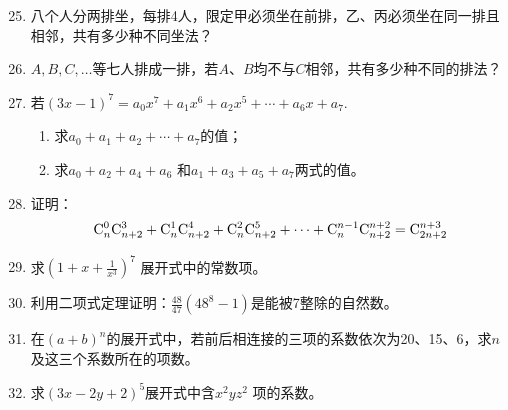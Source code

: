 \begin{enumerate}
  \setcounter{enumi}{24}  
  \item 八个人分两排坐，每排4人，限定甲必须坐在前排，乙、丙必须坐在同一排且相邻，共有多少种不同坐法？
  \item $A,B,C,\ldots$等七人排成一排，若$A$、$B$均不与$C$相邻，共有多少种不同的排法？
\item 若$(3x-1)^{7}=a_{0}x^{7}+a_{1}x^{6}+a_{2}x^{5}+\cdots+a_{6}x+a_{7}$.
\begin{enumerate}[(1)]
    \item 求$ a_{0}+a_{1}+a_{2}+\cdots+a_{7} $的值；
    \item 求$ a_{0}+a_{2}+a_{4}+a_{6}$ 和$ a_{1}+a_{3}+a_{5}+a_{7} $两式的值。
\end{enumerate}

\item 证明：
\[
\comb{n}{0}\comb{n+2}{3}+\comb{n}{1}\comb{n+2}{4}+\comb{n}{2}\comb{n+2}{5}+\cdots+\comb{n}{n-1}\comb{n+2}{n+2} =\comb{2n+2}{n+3}\]

\item 求$\left(1+x+\frac{1}{x^{3}}\right)^{7}$ 展开式中的常数项。

\item 利用二项式定理证明：$\frac{48}{47}\left(48^{8}-1\right)$是能被7整除的自然数。
\item 在$ (a+b)^{n} $的展开式中，若前后相连接的三项的系数依次为20、15、6，求$n$及这三个系数所在的项数。

\item 求$ (3x-2y+2)^{5} $展开式中含$x^{2}yz^{2}$ 项的系数。
\end{enumerate}

